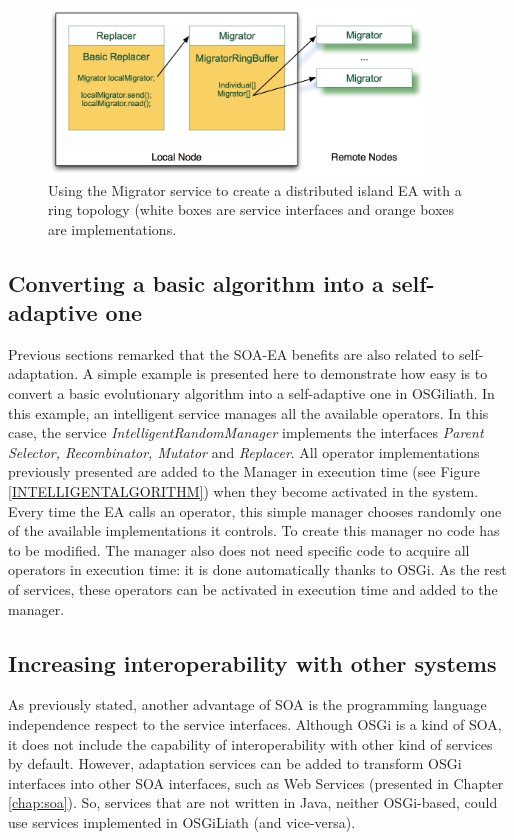 \begin{figure}
\centering
\includegraphics[width=10cm]{gfx/osgiliath/migrator.png}


\caption{Using the Migrator service to create a distributed island EA with a ring topology (white boxes are service interfaces and orange boxes are implementations.}
\label{AXISFIGURE}
\end{figure}

\subsection{Converting a basic algorithm into a self-adaptive one}

Previous sections remarked that the SOA-EA benefits are also related to self-adaptation. A simple example is presented here to demonstrate how easy is to convert a basic evolutionary algorithm into a self-adaptive one in OSGiliath. In this example, an intelligent service manages all the available operators. In this case, the service {\em IntelligentRandomManager} implements the interfaces {\em Parent Selector, Recombinator, Mutator} and {\em Replacer}. All operator implementations previously presented are added to the Manager in execution time (see Figure \ref{INTELLIGENTALGORITHM}) when they become activated in the system. Every time the EA calls an operator, this simple manager chooses randomly one of the available implementations it controls. To create this manager no code has to be modified. The manager also does not need specific code to acquire all operators in execution time: it is done automatically thanks to OSGi. As the rest of services, these operators can be activated in execution time and added to the manager. 



\subsection{Increasing interoperability with other systems}

As previously stated, another advantage of SOA is the programming language independence respect to the service interfaces. Although OSGi is a kind of SOA, it does not include  the capability of interoperability with other kind of services by default. However, adaptation services can be added to transform OSGi interfaces into other SOA interfaces, such as Web Services (presented in Chapter \ref{chap:soa}). So, services that are not written in Java, neither OSGi-based, could use services implemented in OSGiLiath (and vice-versa).

